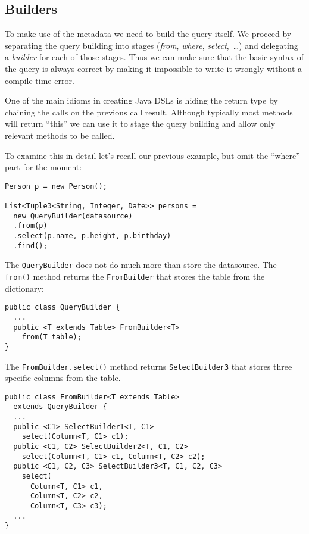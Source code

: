 \documentclass{sig-alternate}
\begin{document}
\subsection{Builders}

To make use of the metadata we need to build the query itself. We proceed by separating the query building into stages (\emph{from}, \emph{where}, \emph{select},~\ldots) and delegating a \emph{builder} for each of those stages. Thus we can make sure that the basic syntax of the query is always correct by making it impossible to write it wrongly without a compile-time error.

One of the main idioms in creating Java DSLs is hiding the return type by chaining the calls on the previous call result. Although typically most methods will return ``this'' we can use it to stage the query building and allow only relevant methods to be called.

To examine this in detail let's recall our previous example, but omit the ``where'' part for the moment:

\begin{verbatim}
Person p = new Person();

List<Tuple3<String, Integer, Date>> persons = 
  new QueryBuilder(datasource)
  .from(p)
  .select(p.name, p.height, p.birthday)
  .find();
\end{verbatim}


The \verb!QueryBuilder! does not do much more than store the datasource. The \verb!from()! method returns the \verb!FromBuilder! that stores the table from the dictionary:

\begin{verbatim}
public class QueryBuilder {
  ...
  public <T extends Table> FromBuilder<T> 
    from(T table);
}
\end{verbatim}

The \verb!FromBuilder.select()! method returns \verb!SelectBuilder3! that stores three specific columns from the table. 

\begin{verbatim}
public class FromBuilder<T extends Table> 
  extends QueryBuilder {
  ...
  public <C1> SelectBuilder1<T, C1> 
    select(Column<T, C1> c1);
  public <C1, C2> SelectBuilder2<T, C1, C2> 
    select(Column<T, C1> c1, Column<T, C2> c2);
  public <C1, C2, C3> SelectBuilder3<T, C1, C2, C3> 
    select(
      Column<T, C1> c1, 
      Column<T, C2> c2, 
      Column<T, C3> c3);
  ...
}
\end{verbatim}
\end{document}
